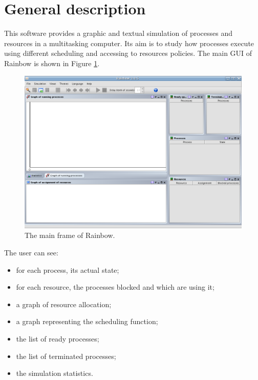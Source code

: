\documentclass[10pt,a4paper,twoside,titlepage]{article}
\begin{document}
\section{General description}
\label{sec:general_description}
This software provides a graphic and textual simulation of processes and resources in a multitasking computer. Its aim is to study how processes execute using different scheduling and accessing to resources policies. The main GUI of Rainbow is shown in Figure \ref{fig:main_window}. 
\begin{figure}[tb]
	\begin{center}
		\includegraphics[scale=0.4]{main_window}
		\caption[The main frame of Rainbow]{The main frame of Rainbow.}
		\label{fig:main_window}
	\end{center}
\end{figure}
The user can see: \\
\begin{itemize}
 \item for each process, its actual state;
 \item for each resource, the processes blocked and which are using it;
 \item a graph of resource allocation;
 \item a graph representing the scheduling function;
 \item the list of ready processes;
 \item the list of terminated processes;
 \item the simulation statistics.
\end{itemize}
\end{document}
